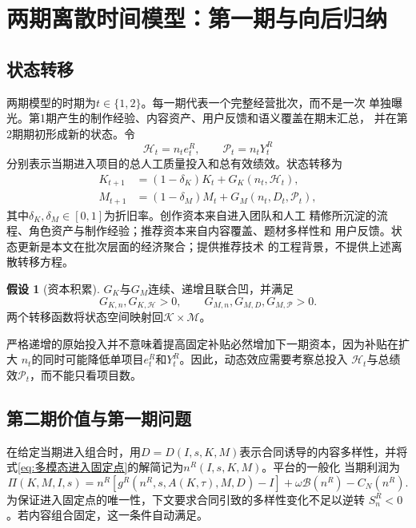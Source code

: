 \documentclass[UTF8, a4paper, 12pt, fontset=fandol]{ctexart}
\theoremstyle{definition}
\newtheorem{assumption}{假设}[section]
\theoremstyle{remark}
\begin{document}
\section{两期离散时间模型：第一期与向后归纳}
\label{sec:two-period}

\subsection{状态转移}
两期模型的时期为$t\in\{1,2\}$。每一期代表一个完整经营批次，而不是一次
单独曝光。第1期产生的制作经验、内容资产、用户反馈和语义覆盖在期末汇总，
并在第2期期初形成新的状态。令
\begin{equation*}
  \mathcal H_t=n_te_t^R,
  \qquad
  \mathcal P_t=n_tY_t^R
\end{equation*}
分别表示当期进入项目的总人工质量投入和总有效绩效。状态转移为
\begin{align}
  K_{t+1}
  &=(1-\delta_K)K_t
  +G_K(n_t,\mathcal H_t),
  \label{eq:创作资本转移}\\
  M_{t+1}
  &=(1-\delta_M)M_t
  +G_M(n_t,D_t,\mathcal P_t),
  \label{eq:推荐资本转移}
\end{align}
其中$\delta_K,\delta_M\in[0,1]$为折旧率。创作资本来自进入团队和人工
精修所沉淀的流程、角色资产与制作经验；推荐资本来自内容覆盖、题材多样性和
用户反馈。状态更新是本文在批次层面的经济聚合；\citet{zhou2026wemm}提供推荐技术
的工程背景，不提供上述离散转移方程。

\begin{assumption}[资本积累]
  \label{ass:资本积累}
  $G_K$与$G_M$连续、递增且联合凹，并满足
  \begin{equation*}
    G_{K,n},G_{K,\mathcal H}>0,
    \qquad
    G_{M,n},G_{M,D},G_{M,\mathcal P}>0.
  \end{equation*}
  两个转移函数将状态空间映射回$\mathcal K\times\mathcal M$。
\end{assumption}
严格递增的原始投入并不意味着提高固定补贴必然增加下一期资本，因为补贴在扩大
$n_t$的同时可能降低单项目$e_t^R$和$Y_t^R$。因此，动态效应需要考察总投入
$\mathcal H_t$与总绩效$\mathcal P_t$，而不能只看项目数。

\subsection{第二期价值与第一期问题}
在给定当期进入组合时，用$D=D(I,s,K,M)$表示合同诱导的内容多样性，并将
式\eqref{eq:多模态进入固定点}的解简记为$n^R(I,s,K,M)$。平台的一般化
当期利润为
\begin{equation}
  \Pi(K,M,I,s)
  =n^R\left[g^R(n^R,s,A(K,\tau),M,D)-I\right]
  +\omega\mathcal B(n^R)-C_N(n^R).
  \label{eq:一般化当期利润}
\end{equation}
为保证进入固定点的唯一性，下文要求合同引致的多样性变化不足以逆转
$S_n^R<0$。若内容组合固定，这一条件自动满足。
\end{document}
